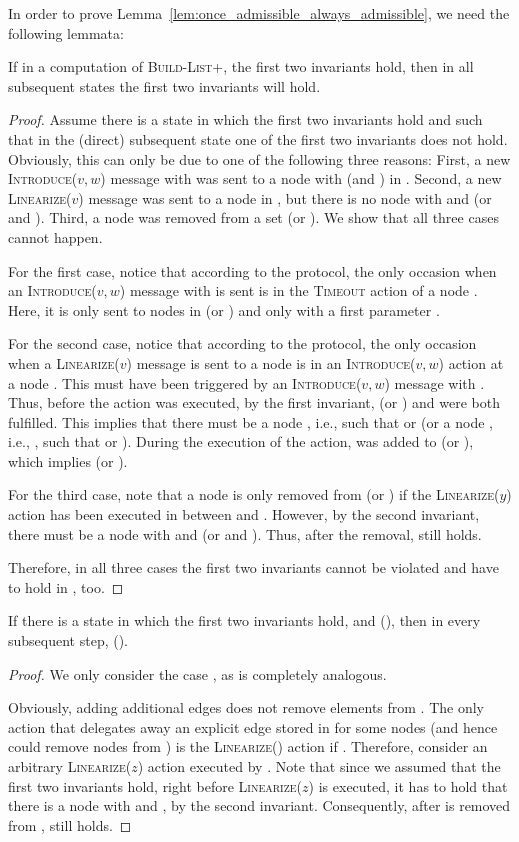 \documentclass[a4paper,USenglish]{lipics}
\newcommand{\blp}{\textsc{Build-List+}\xspace}
\newcommand{\linearize}[1]{\textsc{Linearize(\ensuremath{#1})}\xspace}
\newcommand{\introduce}[1]{\textsc{Introduce(\ensuremath{#1})}\xspace}
\newcommand{\timeout}{\textsc{Timeout}\xspace}
\begin{document}
In order to prove Lemma~\ref{lem:once_admissible_always_admissible}, we need the following lemmata:
\begin{lemma}\label{lem:once_first_two_invariants_hold_then_always}
 If in a computation of \blp, the first two invariants hold, then in all subsequent states the first two invariants will hold.
\end{lemma}
\begin{proof}
 Assume there is a state  in which the first two invariants hold and such that in the (direct) subsequent state  one of the first two invariants does not hold.
 Obviously, this can only be due to one of the following three reasons:
 First, a new \introduce{v,w} message with  was sent to a node  with  (and ) in .
 Second, a new \linearize{v} message was sent to a node  in , but there is no node  with  and  (or  and ).
 Third, a node  was removed from a set  (or ).
 We show that all three cases cannot happen.
 
 For the first case, notice that according to the protocol, the only occasion when an \introduce{v,w} message with  is sent is in the \timeout action of a node .
 Here, it is only sent to nodes in  (or ) and only with a first parameter .
 
 For the second case, notice that according to the protocol, the only occasion when a \linearize{v} message is sent to a node  is in an \introduce{v,w} action at a node .
 This must have been triggered by an \introduce{v,w} message with .
 Thus, before the action was executed, by the first invariant,  (or ) and  were both fulfilled.
 This implies that there must be a node , i.e.,  such that  or  (or a node , i.e., , such that  or ).
 During the execution of the action,  was added to  (or ), which implies  (or ).
 
 For the third case, note that a node  is only removed from  (or ) if the \linearize{y} action has been executed in  between  and .
 However, by the second invariant, there must be a node  with  and  (or  and ).
 Thus, after the removal,  still holds.
 
 Therefore, in all three cases the first two invariants cannot be violated and have to hold in , too.
\end{proof}


\begin{lemma}\label{lem:R_grows_monotonically}
  If there is a state in which the first two invariants hold, and  (), then in every subsequent step,  ().
\end{lemma}
\begin{proof}
We only consider the case , as  is completely analogous.

Obviously, adding additional edges does not remove elements from .
The only action that delegates away an explicit edge  stored in  for some nodes  (and hence could remove nodes from ) is the \linearize{} action if .
Therefore, consider an arbitrary \linearize{z} action executed by .
Note that since we assumed that the first two invariants hold, right before \linearize{z} is executed, it has to hold that there is a node  with  and , by the second invariant.
Consequently, after  is removed from ,  still holds.
\end{proof}
\end{document}
